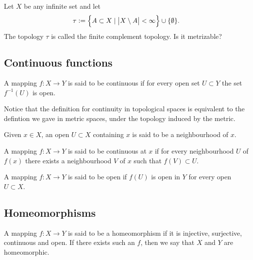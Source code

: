 \documentclass[11pt,a4paper]{article}
\begin{document}
\begin{example}
  Let $X$ be any infinite set and let 
  \[
    \tau := \left\{A \subset X \mid \left\lvert X \setminus A\right\rvert < \infty\right\} \cup
    \{\emptyset\}.
  \]
  The topology $\tau$ is called the finite complement topology. Is it 
  metrizable?
\end{example}

\subsection{Continuous functions}

\begin{definition}[Continuity]
  A mapping $f \colon X \to Y$ is said to be continuous if for every open
  set $U \subset Y$ the set $f^{-1}(U)$ is open.
\end{definition}

Notice that the definition for continuity in topological spaces is equivalent
to the defintion we gave in metric spaces, under the topology induced by
the metric.

\begin{definition}[Neighbourhood]
  Given $x \in X$, an open $U \subset X$ containing $x$ is said to be a
  neighbourhood of $x$.
\end{definition}

\begin{definition}
  A mapping $f \colon X \to Y$ is said to be continuous at $x$ if for 
  every neighbourhood $U$ of $f(x)$ there exists a neighbourhood $V$
  of $x$ such that $f(V) \subset U$.
\end{definition}

\begin{definition}
  A mapping $f \colon X \to Y$ is said to be open if $f(U)$ is open in $Y$
  for every open $U \subset X$.
\end{definition}

\subsection{Homeomorphisms}

\begin{definition}[Homeomorphism]
  A mapping $f \colon X \to Y$ is said to be a homeomorphism if it is
  injective, surjective, continuous and open. If there exists such an $f$, 
  then we say that $X$ and $Y$ are homeomorphic.
\end{definition}
\end{document}
